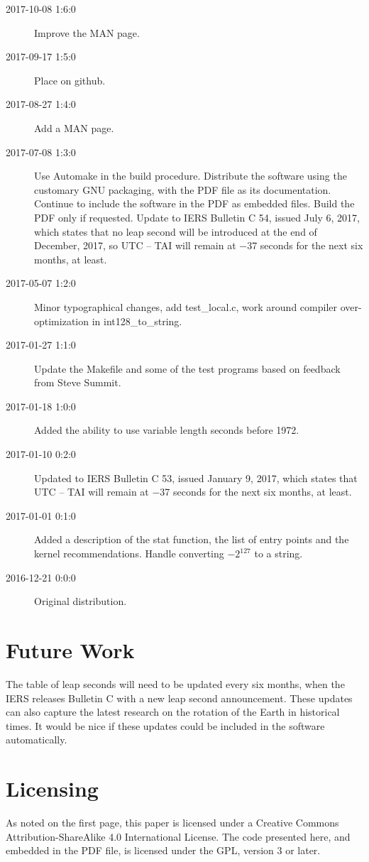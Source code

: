 \documentclass[letterpaper,twoside]{article}
\begin{document}
\begin{description}
\item[2017-10-08 1:6:0] Improve the MAN page.
\item[2017-09-17 1:5:0] Place on github.
\item[2017-08-27 1:4:0] Add a MAN page.
\item[2017-07-08 1:3:0] Use Automake in the build procedure.
  Distribute the software using the customary GNU packaging,
  with the PDF file as its documentation.  Continue to include
  the software in the PDF as embedded files.  Build the PDF
  only if requested.  Update to IERS Bulletin C 54, issued
  July 6, 2017, which states that no leap second will be introduced
  at the end of December, 2017, so UTC -- TAI will remain at
  \num{-37} seconds for the next six months, at least.
\item[2017-05-07 1:2:0] Minor typographical changes, add test\_local.c,
  work around compiler over-optimization in int128\_to\_string.
\item[2017-01-27 1:1:0] Update the Makefile and some of the test programs
  based on feedback from Steve Summit.
\item[2017-01-18 1:0:0] Added the ability to use variable length seconds
  before 1972.
\item[2017-01-10 0:2:0] Updated to IERS Bulletin C 53,
  issued January 9, 2017, which states that UTC -- TAI
  will remain at \num{-37} seconds for the next six months, at least.
\item[2017-01-01 0:1:0] Added a description of the stat function,
  the list of entry points and the kernel recommendations.
  Handle converting $-2^{127}$ to a string. 
\item[2016-12-21 0:0:0] Original distribution.
\end{description}

\section{Future Work}
The table of leap seconds will need to be updated every six months,
when the IERS releases Bulletin C with a new leap second announcement.
These updates can also capture the latest research on the rotation
of the Earth in historical times.  It would be nice if these updates
could be included in the software automatically.

\section{Licensing}
\label{section:Licensing}
As noted on the first page, this paper is licensed under a Creative
Commons Attribution-ShareAlike 4.0 International License.  The code
presented here, and embedded in the PDF file, is licensed under
the GPL, version 3 or later.
\end{document}
